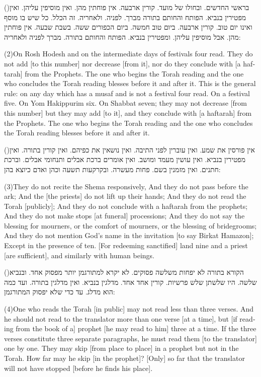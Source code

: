 \documentclass[12pt, openany]{book}
\newcommand{\sethebfont}{
\fontsize{10.5pt}{13.1pt} \selectfont
}
\newcommand{\hebeng}[2]{
	{\sethebfont #1\\}
	
	\begin{english}
		#2
	\end{english}
	\clearpage
}
\newcommand{\vsnum}[1]{(\hebrewnumeral{#1})\space}
\newcommand{\vsnumeng}[1]{(#1)\space}
\begin{document}
\hebeng{\vsnum{2}בראשי החדשים. ובחולו של מועד. קורין ארבעה. אין פוחתין מהן. ואין מוסיפין עליהן. ואין מפטירין בנביא. הפותח והחותם בתורה מברך. לפניה. ולאחריה. זה הכלל. כל שיש בו מוסף ואינו יום טוב. קורין ארבעה. ביום טוב חמשה. ביום הכפורים ששה. בשבת שבעה. אין פוחתין מהן. אבל מוסיפין עליהן. ומפטירין בנביא. הפותח והחותם בתורה. מברך לפניה ולאחריה: }{\vsnumeng{2}On Rosh Hodesh and on the intermediate days of festivals four read. They do not add {[to this number]} nor decrease {[from it]}, nor do they conclude with {[a haftarah]} from the Prophets. The one who begins the Torah reading and the one who concludes the Torah reading blesses before it and after it. This is the general rule: on any day which has a musaf and is not a festival four read. On a festival five. On Yom Hakippurim six. On Shabbat seven; they may not decrease {[from this number]} but they may add {[to it]}, and they conclude with {[a haftarah]} from the Prophets. The one who begins the Torah reading and the one who concludes the Torah reading blesses before it and after it.}%

\hebeng{\vsnum{3}אין פורסין את שמע. ואין עוברין לפני התיבה. ואין נושאין את כפיהם. ואין קורין בתורה. ואין מפטירין בנביא. ואין עושין מעמד ומושב. ואין אומרים ברכת אבלים ותנחומי אבלים. וברכת חתנים. ואין מזמנין בשם. פחות מעשרה. ובקרקעות תשעה וכהן ואדם כיוצא בהן: }{\vsnumeng{3}They do not recite the Shema responsively, And they do not pass before the ark; And the {[the priests]} do not lift up their hands; And they do not read the Torah {[publicly]}; And they do not conclude with a haftarah from the prophets; And they do not make stops {[at funeral]} processions; And they do not say the blessing for mourners, or the comfort of mourners, or the blessing of bridegrooms; And they do not mention God’s name in the invitation {[to say Birkat Hamazon]}; Except in the presence of ten. {[For redeeming sanctified]} land nine and a priest {[are sufficient]}, and similarly with human beings.}%

\hebeng{\vsnum{4}הקורא בתורה לא יפחות משלשה פסוקים. לא יקרא למתורגמן יותר מפסוק אחד. ובנביא שלשה. היו שלשתן שלש פרשיות. קורין אחד אחד. מדלגין בנביא. ואין מדלגין בתורה. ועד כמה הוא מדלג. עד כדי שלא יפסוק המתורגמן: }{\vsnumeng{4}One who reads the Torah {[in public]} may not read less than three verses. And he should not read to the translator more than one verse {[at a time]}, but {[if reading from the book of a]} prophet {[he may read to him]} three at a time. If the three verses constitute three separate paragraphs, he must read them {[to the translator]} one by one. They may skip {[from place to place]} in a prophet but not in the Torah. How far may he skip {[in the prophet]}? {[Only]} so far that the translator will not have stopped {[before he finds his place]}.}%
\end{document}
